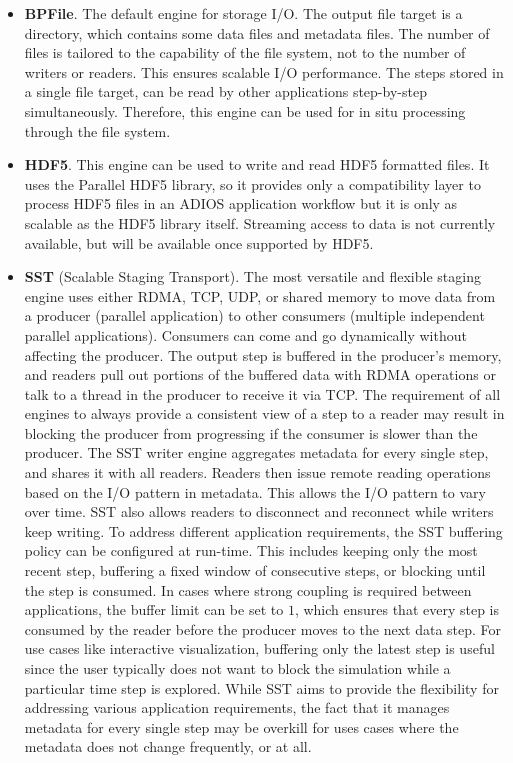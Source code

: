 \begin{itemize}
\item \textbf{BPFile}. The default engine for storage I/O. The output file target is a directory, which contains some data files and metadata files. The number of files is tailored to the capability of the file system, not to the number of writers or readers. This ensures scalable I/O performance. The steps stored in a single file target, can be read by other applications step-by-step simultaneously. Therefore, this engine can be used for in situ processing through the file system. 

\item \textbf{HDF5}. This engine can be used to write and read HDF5 formatted files. It uses the Parallel HDF5 library, so it provides only a compatibility layer to process HDF5 files in an ADIOS application workflow but it is only as scalable as the HDF5 library itself. Streaming access to data is not currently available, but will be available once supported by HDF5.

\item \textbf{SST} (Scalable Staging Transport). The most versatile and flexible staging engine uses either RDMA, TCP, UDP, or shared memory to move data from a producer (parallel application) to other consumers (multiple independent parallel applications). Consumers can come and go dynamically without affecting the producer. The output step is buffered in the producer's memory, and readers pull out portions of the buffered data with RDMA operations or talk to a thread in the producer to receive it via TCP. The requirement of all engines to always provide a consistent view of a step to a reader may result in blocking the producer from progressing if the consumer is slower than the producer. The SST writer engine aggregates metadata for every single step, and shares it with all readers. Readers then issue remote reading operations based on the I/O pattern in metadata. This allows the I/O pattern to vary over time. SST also allows readers to disconnect and reconnect while writers keep writing.
To address different application requirements, the SST buffering policy can be configured at run-time. This includes keeping only the most recent step, buffering a fixed window of consecutive steps, or blocking until the step is consumed. In cases where strong coupling is required between applications, the buffer limit can be set to $1$, which ensures that every step is consumed by the reader before the producer moves to the next data step.
For use cases like interactive visualization, buffering only the latest step is useful since the user typically does not want to block the simulation while a particular time step is explored.
While SST aims to provide the flexibility for addressing various application requirements, the fact that it manages metadata for every single step may be overkill for uses cases where the metadata does not change frequently, or at all.


\end{itemize}

